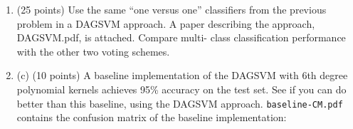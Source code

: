 \documentclass[12pt]{report}
\begin{document}
\begin{enumerate}[leftmargin=.2in]
\begin {enumerate}
Be sure to specify your voting scheme using a method described in the book . To analyze accuracy, you will find it helpful to produce and analyze the multiclass confusion matrix ({\texttt{http://en.wikipedia.org/wiki/Confusion\_matrix}}), in addition to examining the overall error rate. 

\item (25 points) Use the same “one versus one” classifiers from the previous problem in a DAGSVM approach. A paper describing the approach, DAGSVM.pdf,  is  attached. Compare multi- class classification performance with the other two voting schemes.

\item (c) (10 points) A baseline implementation of the DAGSVM with 6th degree polynomial kernels achieves 95\% accuracy on the test set. See if you can do better than this baseline, using the DAGSVM approach. {\texttt{baseline-CM.pdf}} contains the confusion matrix of the baseline implementation:


\end{enumerate}

\end{enumerate}

  
\end{document}
